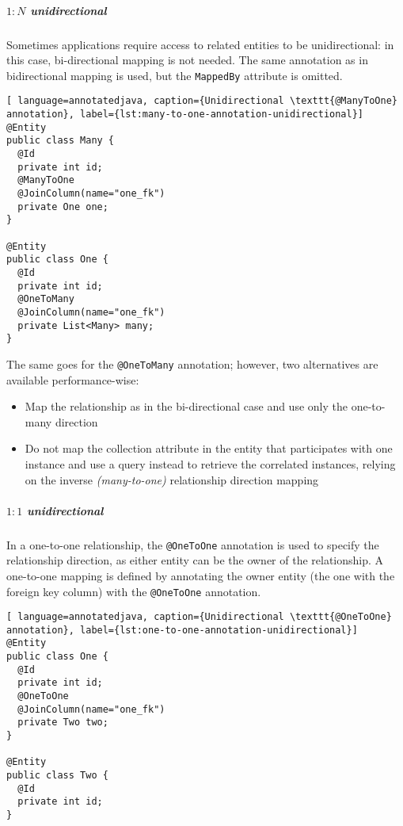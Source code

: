 \documentclass[english]{article}
\begin{document}
\begin{onepage}
  \subparagraph*{\(1:N\) unidirectional}

  Sometimes applications require access to related entities to be unidirectional: in this case, bi-directional mapping is not needed.
  The same annotation as in bidirectional mapping is used, but the \texttt{MappedBy} attribute is omitted.

  \begin{lstlisting}[ language=annotatedjava, caption={Unidirectional \texttt{@ManyToOne} annotation}, label={lst:many-to-one-annotation-unidirectional}]
@Entity
public class Many {
  @Id
  private int id;
  @ManyToOne
  @JoinColumn(name="one_fk")
  private One one;
}

@Entity
public class One {
  @Id
  private int id;
  @OneToMany
  @JoinColumn(name="one_fk")
  private List<Many> many;
}
\end{lstlisting}

  The same goes for the \texttt{@OneToMany} annotation;
  however, two alternatives are available performance-wise:

  \begin{itemize}
    \item Map the relationship as in the bi-directional case and use only the one-to-many direction
    \item Do not map the collection attribute in the entity that participates with one instance and use a query instead to retrieve the correlated instances, relying on the inverse \textit{(many-to-one)} relationship direction mapping
  \end{itemize}
\end{onepage}

\begin{onepage}
  \subparagraph*{\(1:1\) unidirectional}
  In a one-to-one relationship, the \texttt{@OneToOne} annotation is used to specify the relationship direction, as either entity can be the owner of the relationship.
  A one-to-one mapping is defined by annotating the owner entity (the one with the foreign key column) with the \texttt{@OneToOne} annotation.

  \begin{lstlisting}[ language=annotatedjava, caption={Unidirectional \texttt{@OneToOne} annotation}, label={lst:one-to-one-annotation-unidirectional}]
@Entity
public class One {
  @Id
  private int id;
  @OneToOne
  @JoinColumn(name="one_fk")
  private Two two;
}

@Entity
public class Two {
  @Id
  private int id;
}
\end{lstlisting}
\end{onepage}
\end{document}
